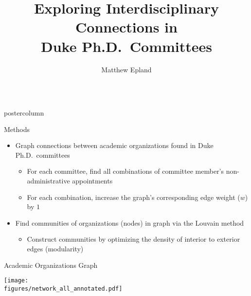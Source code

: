 \documentclass{beamer}
\title{\huge Exploring Interdisciplinary Connections in\\Duke Ph.D.\ Committees}
\author{Matthew Epland}
\institute[Duke]{Duke University}
\newcommand{\figures}{../outputs/plots}
\newlength{\columnheight}
\begin{document}
\begin{frame}
\vspace{1.7cm} %
\begin{columns}
\begin{column}{.57\textwidth}
\begin{beamercolorbox}[center]{postercolumn}
\begin{minipage}{.98\textwidth} %
\parbox[t][\columnheight]{\textwidth}{ %

  \begin{myblock}{Methods}
    \begin{itemize}
      \item Graph connections between academic organizations found in Duke Ph.D.\ committees
      \begin{itemize}
        \item For each committee, find all combinations of committee member's non-administrative appointments
        \item For each combination, increase the graph's corresponding edge weight ($w$) by $1$
      \end{itemize}
    \end{itemize}

    \vspace{0.5cm}

    \begin{center}
    \end{center}

    \vspace{0.5cm}

    \begin{itemize}
      \item Find communities of organizations (nodes) in graph via the Louvain method \cite{louvain}
      \begin{itemize}
        \item Construct communities by optimizing the density of interior to exterior edges (modularity)
      \end{itemize}
    \end{itemize}
  \end{myblock}\vfill


  \begin{myblock}{Academic Organizations Graph}
    \vspace{0.8cm}
    \begin{center}
      \texttt{[image: \\figures/network\_all\_annotated.pdf]}
    \end{center}
  \end{myblock}\vfill


}
\end{minipage}
\end{beamercolorbox}
\end{column}
\end{columns}
\end{frame}
\end{document}
